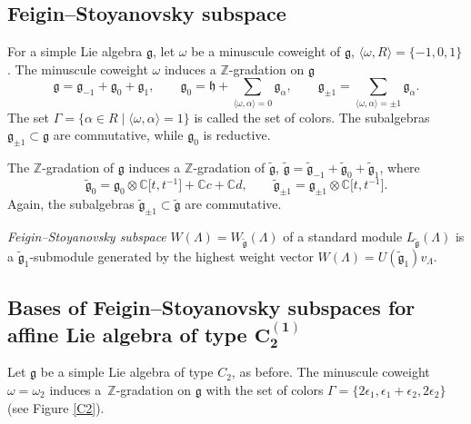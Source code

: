 \documentclass[10pt,a4paper]{amsart}
\newcommand{\Z}
{{\mathbb Z}}
\newcommand{\g}
{{\mathfrak g}}
\newcommand{\gt}
{\tilde{{\mathfrak g}}}
\numberwithin{equation}{section}
\begin{document}

\subsection{Feigin--Stoyanovsky subspace}

For a simple Lie algebra $\g$, let $\omega$ be a minuscule coweight of $\g$, $\langle \omega, R\rangle = \{-1,0,1\}$. The minuscule coweight $\omega$ induces a $\Z$-gradation on $\g$
\[
\mathfrak g =\mathfrak g_{-1} + \mathfrak g_0 + \mathfrak g_1 , \qquad
{\mathfrak g}_0 = {\mathfrak h} +
\sum_{\langle\omega,\alpha\rangle=0}  {\mathfrak g}_\alpha,
\qquad
\displaystyle {\mathfrak g}_{\pm1} =
\sum_{\langle\omega,\alpha\rangle= \pm 1}  {\mathfrak g}_\alpha.
\]
The set
$
	\Gamma =
	\{ \alpha \in R \mid \langle\omega,\alpha\rangle = 1\}
$
is called the set of colors.
The subalgebras ${\mathfrak g}_{\pm1}\subset\mathfrak g$ are commutative, while $\g_0$ is reductive.

The $\Z$-gradation of $\g$ induces a $\Z$-gradation of $\gt$,
$
\gt =\gt_{-1} + \gt_0 + \gt_1$,
where
\[
\gt_0 = \g_0 \otimes \mathbb{C}\bigl[t,t^{-1}\bigr] + \mathbb{C}c + \mathbb{C} d,\qquad
\gt_{\pm 1} = \g_{\pm 1} \otimes \mathbb{C}\bigl[t,t^{-1}\bigr].\]
Again, the subalgebras $\gt_{\pm1}\subset\gt$ are commutative.

{\em Feigin--Stoyanovsky subspace} $W(\Lambda)=W_{\gt}(\Lambda)$ of a standard module $L_{\gt}(\Lambda)$ is a $\gt_1$-submodule generated by the highest weight vector
$W(\Lambda)=U(\gt_1)v_\Lambda$.




\subsection[Bases of Feigin--Stoyanovsky subspaces for affine Lie algebra of type C\_2\^(1)]{Bases of Feigin--Stoyanovsky subspaces for affine Lie algebra of type $\boldsymbol{ C_2^{(1)}}$}

Let $\g$ be a simple Lie algebra of type $C_2$, as before.
The minuscule coweight $\omega=\omega_2$ induces a~$\Z$-gradation on $\g$ with the set of colors $\Gamma = \{2\epsilon_1, \epsilon_1 + \epsilon_2, 2\epsilon_2\}$ (see Figure \ref{C2}).
\end{document}
